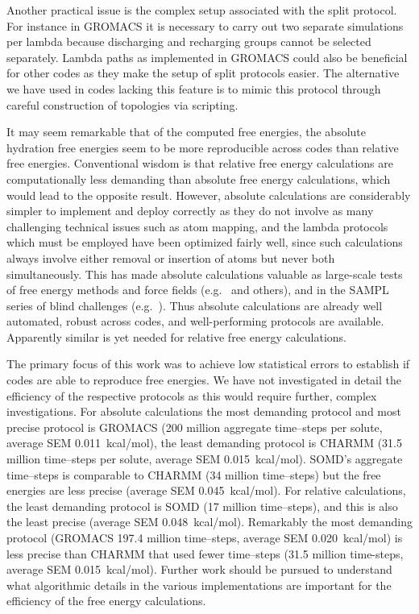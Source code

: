 \documentclass[journal=jctcce,manuscript=article]{achemso}
\begin{document}
 Another practical issue is the complex setup associated with the
 split protocol. For instance in GROMACS it is necessary to carry out two separate simulations per lambda because discharging and recharging groups cannot be selected separately.
Lambda paths as implemented in GROMACS could also be beneficial for other codes as they make the setup of split protocols easier.  The alternative we have used in codes lacking this feature is to mimic this protocol through careful construction of
topologies via scripting.

It may seem remarkable that of the computed free energies, the absolute hydration free energies seem to be more reproducible across codes than relative free energies.
Conventional wisdom is that relative free energy calculations are computationally less demanding than absolute free energy calculations, which would lead to the opposite result.
However, absolute calculations are considerably simpler to implement and deploy correctly as they do not involve as many challenging technical issues such as atom mapping, and the lambda protocols which must be employed have been optimized fairly well, since such calculations always involve either removal or insertion of atoms but never both simultaneously.
This has made absolute calculations valuable as large-scale tests of free energy methods and force fields (e.g.~\cite{Mobley2014, doi:10.1021/ct300203w} and others), and in the SAMPL series of blind challenges (e.g.~\cite{fennell_fixed-charge_2014, geballe_sampl3_2012}).
Thus absolute calculations are already well automated, robust across codes, and well-performing protocols are available.
Apparently similar is yet needed for relative free energy calculations.

The primary focus of this work was to achieve low statistical errors
to establish if codes are able to reproduce free energies.  We have
not investigated in detail the efficiency of the respective protocols
as this would require further, complex investigations.  For absolute
calculations the most demanding protocol and most precise protocol is
GROMACS (200 million aggregate time--steps per solute, average SEM
\SI{0.011}{kcal/mol}), the least demanding protocol is CHARMM (31.5 million
time--steps per solute, average SEM \SI{0.015}{kcal/mol}).  SOMD's aggregate
time--steps is comparable to CHARMM (34 million time--steps) but the
free energies are less precise (average SEM \SI{0.045}{kcal/mol}).
For relative calculations, the least demanding protocol is SOMD (17
million time--steps), and this is also the least precise (average SEM
\SI{0.048}{kcal/mol}).  Remarkably the most demanding protocol (GROMACS
197.4 million time--steps, average SEM \SI{0.020}{kcal/mol}) is less precise
than CHARMM that used fewer time--steps (31.5 million time-steps,
average SEM \SI{0.015}{kcal/mol}).  Further work should be pursued to
understand what algorithmic details in the various implementations are
important for the efficiency of the free energy calculations.
\end{document}
